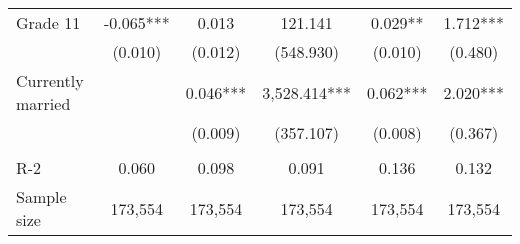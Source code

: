 \begin{tabular}{lccccc}
 \hspace{0.3cm} Grade 11   & -0.065***   & 0.013   & 121.141   & 0.029**   & 1.712***  \\
 & (0.010)   & (0.012)   & (548.930)   & (0.010)   & (0.480)  \\
 Currently married   &   & 0.046***   & 3,528.414***   & 0.062***   & 2.020***  \\
 &    & (0.009)   & (357.107)   & (0.008)   & (0.367)  \\
\\
R-2 & 0.060 & 0.098 & 0.091 & 0.136 & 0.132 \\
Sample size & 173,554 & 173,554 & 173,554 & 173,554  & 173,554 \\
\bottomrule
\bottomrule
\end{tabular}